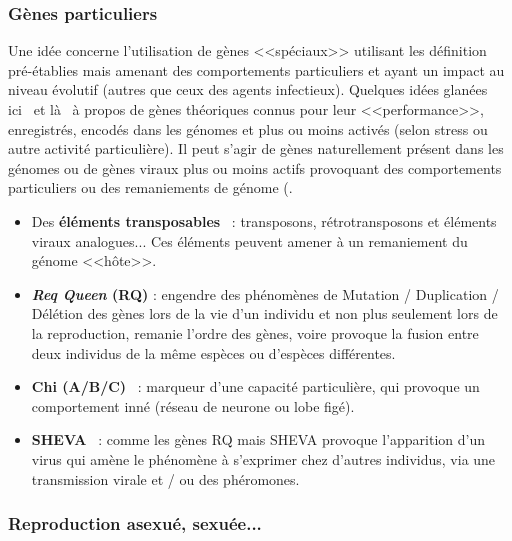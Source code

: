 \documentclass[11pt,twoside,a4paper]{article}
\begin{document}
\subsubsection{G{\`e}nes particuliers}

Une id{\'e}e concerne l'utilisation de g{\`e}nes <<sp{\'e}ciaux>> utilisant les d{\'e}finition pr{\'e}-{\'e}tablies mais amenant des comportements particuliers et ayant un impact au niveau {\'e}volutif (autres que ceux des agents infectieux). Quelques id{\'e}es glan{\'e}es ici~\cite{BearDarwin01,BearDarwin03} et l{\`a}~\cite{DiasporaKubeMc} {\`a} propos de g{\`e}nes th{\'e}oriques connus pour leur <<performance>>, enregistr{\'e}s, encod{\'e}s dans les g{\'e}nomes et plus ou moins activ{\'e}s (selon stress ou autre activit{\'e} particuli{\`e}re). Il peut s'agir de g{\`e}nes naturellement pr{\'e}sent dans les g{\'e}nomes ou de g{\`e}nes viraux plus ou moins actifs provoquant des comportements particuliers ou des remaniements de g{\'e}nome (. 
\begin{itemize}
	\item Des \textbf{{\'e}l{\'e}ments transposables}~\cite{LeRiBi03,RiBiGo02,RiMaGo02} : transposons, r{\'e}trotransposons et {\'e}l{\'e}ments viraux analogues... Ces {\'e}l{\'e}ments peuvent amener {\`a} un remaniement du g{\'e}nome <<h{\^o}te>>.
	\item \textbf{\emph{Req Queen} (RQ)} : engendre des ph{\'e}nom{\`e}nes de Mutation / Duplication / D{\'e}l{\'e}tion des g{\`e}nes lors de la vie d'un individu et non plus seulement lors de la reproduction, remanie l'ordre des g{\`e}nes, voire provoque la fusion entre deux individus de la m{\^e}me esp{\`e}ces ou d'esp{\`e}ces diff{\'e}rentes. 
	\item \textbf{Chi (A/B/C)}~\cite{DiasporaKubeMc} : marqueur d'une capacit{\'e} particuli{\`e}re, qui provoque un comportement inn{\'e} (r{\'e}seau de neurone ou lobe fig{\'e}). 
	\item \textbf{SHEVA}~\cite{BearDarwin01,BearDarwin03} : comme les g{\`e}nes RQ mais SHEVA provoque l'apparition d'un virus qui am{\`e}ne le ph{\'e}nom{\`e}ne {\`a} s'exprimer chez d'autres individus, via une transmission virale et / ou des ph{\'e}romones. 
\end{itemize}

\subsubsection{Reproduction asexu{\'e}, sexu{\'e}e...}
\end{document}
